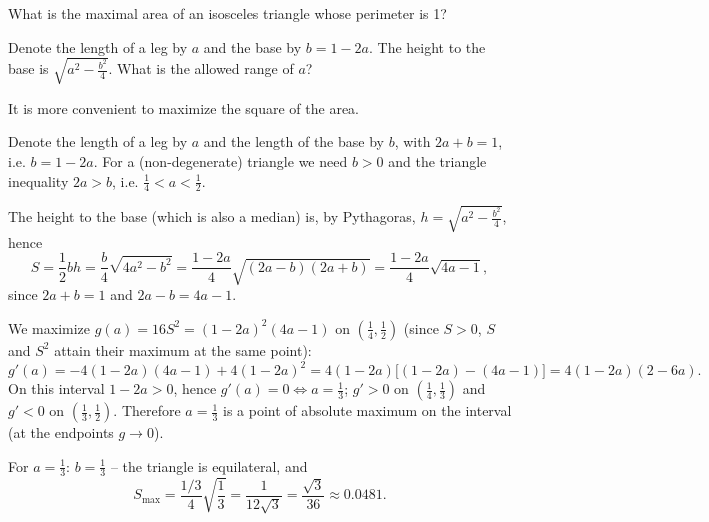 
\begin{question}
What is the maximal area of an isosceles triangle whose perimeter is 1?
\end{question}

\begin{hint}
Denote the length of a leg by $a$ and the base by $b=1-2a$. The height to the base is $\sqrt{a^2-\frac{b^2}{4}}$. What is the allowed range of $a$?
\end{hint}

\begin{hint}
It is more convenient to maximize the square of the area.
\end{hint}

\begin{solution}
Denote the length of a leg by $a$ and the length of the base by $b$, with $2a+b=1$, i.e. $b=1-2a$. For a (non-degenerate) triangle we need $b>0$ and the triangle inequality $2a>b$, i.e. $\frac14<a<\frac12$.

The height to the base (which is also a median) is, by Pythagoras, $h=\sqrt{a^2-\frac{b^2}{4}}$, hence
\[ S=\frac12bh=\frac b4\sqrt{4a^2-b^2}=\frac{1-2a}{4}\sqrt{(2a-b)(2a+b)}=\frac{1-2a}{4}\sqrt{4a-1}, \]
since $2a+b=1$ and $2a-b=4a-1$.

We maximize $g(a)=16S^2=(1-2a)^2(4a-1)$ on $(\frac14,\frac12)$ (since $S>0$, $S$ and $S^2$ attain their maximum at the same point):
\[ g'(a)=-4(1-2a)(4a-1)+4(1-2a)^2=4(1-2a)\big[(1-2a)-(4a-1)\big]=4(1-2a)(2-6a). \]
On this interval $1-2a>0$, hence $g'(a)=0\iff a=\frac13$; $g'>0$ on $(\frac14,\frac13)$ and $g'<0$ on $(\frac13,\frac12)$. Therefore $a=\frac13$ is a point of absolute maximum on the interval (at the endpoints $g\to0$).

For $a=\frac13$: $b=\frac13$ -- the triangle is equilateral, and
\[ S_{\max}=\frac{1/3}{4}\sqrt{\frac13}=\frac{1}{12\sqrt3}=\boxed{\frac{\sqrt3}{36}}\approx0.0481. \]
\end{solution}
